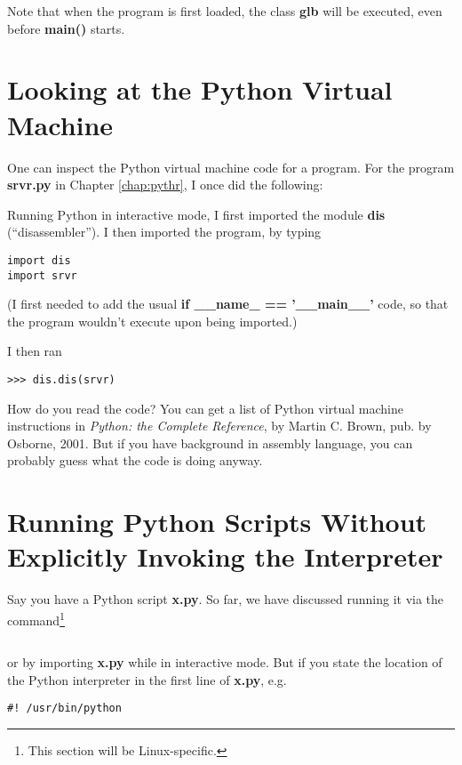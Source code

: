 Note that when the program is first loaded, the class {\bf glb} will be
executed, even before {\bf main()} starts.

\section{Looking at the Python Virtual Machine}

One can inspect the Python virtual machine code for a program.  For the
program {\bf srvr.py} in Chapter \ref{chap:pythr}, I once did the
following:

Running Python in interactive mode, I first imported the module {\bf
dis} (``disassembler'').  I then imported the program, by typing

\begin{lstlisting}
import dis
import srvr
\end{lstlisting}

(I first needed to add the usual {\bf if \_\_name\_ == '\_\_main\_\_'}
code, so that the program wouldn't execute upon being imported.)

I then ran

\begin{Verbatim}[fontsize=\relsize{-2}]
>>> dis.dis(srvr)
\end{Verbatim}

How do you read the code?  You can get a list of Python virtual machine
instructions in {\it Python: the Complete Reference}, by Martin C.
Brown, pub. by Osborne, 2001.  But if you have background in assembly
language, you can probably guess what the code is doing anyway.

\section{Running Python Scripts Without Explicitly Invoking the
Interpreter}

Say you have a Python script {\bf x.py}.  So far, we have discussed
running it via the command\footnote{This section will be Linux-specific.}

\begin{Verbatim}[fontsize=\relsize{-2}]
% python x.py
\end{Verbatim}

or by importing {\bf x.py} while in interactive mode.  But if you state
the location of the Python interpreter in the first line of {\bf x.py},
e.g.

\begin{Verbatim}[fontsize=\relsize{-2}]
#! /usr/bin/python
\end{Verbatim}


